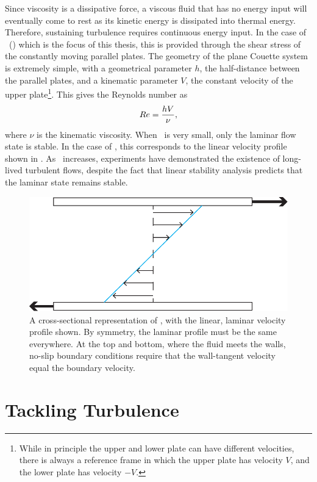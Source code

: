 Since viscosity is a dissipative force, a viscous fluid that has no energy input will eventually come to rest as its kinetic energy is dissipated into thermal energy. Therefore, sustaining turbulence requires continuous energy input. In the case of \pCf\ () which is the focus of this thesis, this is provided through the shear stress of the constantly moving parallel plates. The geometry of the plane Couette system is extremely simple, with a geometrical parameter $h$, the half-distance between the parallel plates, and a kinematic parameter $V$, the constant velocity of the upper plate\footnote{While in principle the upper and lower plate can have different velocities, there is always a reference frame in which the upper plate has velocity $V$, and the lower plate has velocity $-V$.}. This gives the Reynolds number as 
\begin{equation}
Re = \dfrac{hV}{\nu},
\end{equation}
where $\nu$ is the kinematic viscosity. When \ReN~is very small, only the laminar flow state is stable. In the case of \pCf, this corresponds to the linear velocity profile shown in . As \ReN~increases, experiments have demonstrated the existence of long-lived turbulent flows, despite the fact that linear stability analysis predicts that the laminar state remains stable.
\begin{figure}
\centerline{
\includegraphics[scale=0.6]{Figs/planeCouetteMeanFlow}}
\caption{A cross-sectional representation of \pCf, with the linear, laminar velocity profile shown. By symmetry, the laminar profile must be the same everywhere. At the top and bottom, where the fluid meets the walls, no-slip boundary conditions require that the wall-tangent velocity equal the boundary velocity.}\label{fig:planeCouetteBulk}
\end{figure}

\section{Tackling Turbulence} 

